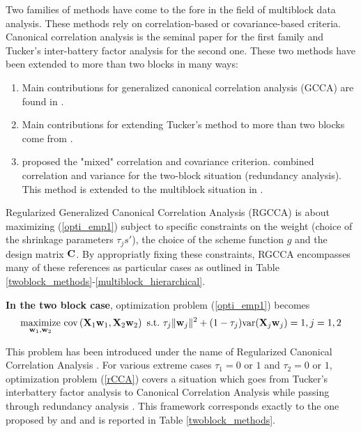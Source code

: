 \documentclass[
]{jss}
\begin{document}
Two families of methods have come to the fore in the field of multiblock
data analysis. These methods rely on correlation-based or
covariance-based criteria. Canonical correlation analysis
\citep{Hotelling1936} is the seminal paper for the first family and
Tucker's inter-battery factor analysis \citep{Tucker1958} for the second
one. These two methods have been extended to more than two blocks in
many ways:

\begin{enumerate}[label=(\roman*)]
\item Main contributions for generalized canonical correlation
analysis (GCCA) are found in \citep{Horst1961, Carroll1968a, Kettenring1971, 
Wold1982, Wold1985, Hanafi2007}.\\

\item Main contributions for extending Tucker's method to more
than two blocks come from \citep{Carroll1968b, Chessel1996, Hanafi2006,
Hanafi2010, Hanafi2011, Hanafi2006, Kramer2007, Smilde2003, TenBerge1988, 
VandeGeer1984, Westerhuis1998, Wold1982, Wold1985}.\\

\item \citep{Carroll1968b} proposed the "mixed" correlation and
covariance criterion. \citep{Wollenberg1977} combined
correlation and variance for the two-block situation (redundancy
analysis). This method is extended to the multiblock
situation in \citep{Tenenhaus2011}.
\end{enumerate}

Regularized Generalized Canonical Correlation Analysis (RGCCA) is about
maximizing (\ref{opti_emp1}) subject to specific constraints on the
weight (choice of the shrinkage parameters \(\tau_js'\)), the choice of
the scheme function \(g\) and the design matrix \(\mathbf{C}\). By
appropriatly fixing these constraints, RGCCA encompasses many of these
references as particular cases as outlined in Table
\ref{twoblock_methods}-\ref{multiblock_hierarchical}.

\textbf{In the two block case}, optimization problem (\ref{opti_emp1})
becomes \begin{equation}
\underset{\mathbf{w}_1, \mathbf{w}_2}{\text{maximize}} \text{
cov}\left(\mathbf{X}_1\mathbf{w}_1, \mathbf{X}_2\mathbf{w}_2 \right) \mathrm{~s.t.~} \tau_j
\Vert \mathbf{w}_j \Vert^2 + (1-\tau_j)\text{var}(\mathbf{X}_j\mathbf{w}_j) = 1, j =1,2 
\label{rCCA} 
\end{equation}

This problem has been introduced under the name of Regularized Canonical
Correlation Analysis \citep{Vinod1976, Leurgans1993, Shawe2004}. For
various extreme cases \(\tau_1 = 0\) or \(1\) and \(\tau_2 = 0\) or
\(1\), optimization problem (\ref{rCCA}) covers a situation which goes
from Tucker's interbattery factor analysis \citep{Tucker1958} to
Canonical Correlation Analysis \citep{Hotelling1933} while passing
through redundancy analysis \citep{Wollenberg1977}. This framework
corresponds exactly to the one proposed by \citep{Borga1997} and
\citep{Burnham1996} and is reported in Table \ref{twoblock_methods}.
\end{document}
